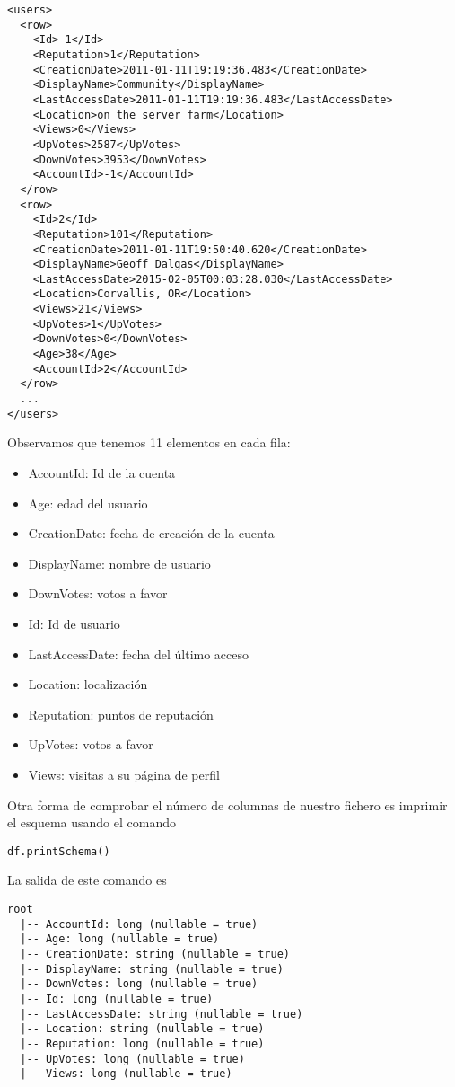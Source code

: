 \documentclass[12pt,a4paper,twoside,openright,titlepage,final]{article}
\begin{document}
\begin{verbatim}
<users>
  <row>
    <Id>-1</Id>
    <Reputation>1</Reputation>
    <CreationDate>2011-01-11T19:19:36.483</CreationDate>
    <DisplayName>Community</DisplayName>
    <LastAccessDate>2011-01-11T19:19:36.483</LastAccessDate>
    <Location>on the server farm</Location>
    <Views>0</Views>
    <UpVotes>2587</UpVotes>
    <DownVotes>3953</DownVotes>
    <AccountId>-1</AccountId>
  </row>
  <row>
    <Id>2</Id>
    <Reputation>101</Reputation>
    <CreationDate>2011-01-11T19:50:40.620</CreationDate>
    <DisplayName>Geoff Dalgas</DisplayName>
    <LastAccessDate>2015-02-05T00:03:28.030</LastAccessDate>
    <Location>Corvallis, OR</Location>
    <Views>21</Views>
    <UpVotes>1</UpVotes>
    <DownVotes>0</DownVotes>
    <Age>38</Age>
    <AccountId>2</AccountId>
  </row>
  ...
</users>
\end{verbatim}

Observamos que tenemos 11 elementos en cada fila:

\begin{itemize}
	\item AccountId: Id de la cuenta
	\item Age: edad del usuario
	\item CreationDate: fecha de creación de la cuenta
	\item DisplayName: nombre de usuario
	\item DownVotes: votos a favor
	\item Id: Id de usuario
	\item LastAccessDate: fecha del último acceso
	\item Location: localización
	\item Reputation: puntos de reputación
	\item UpVotes: votos a favor
	\item Views: visitas a su página de perfil
\end{itemize}

Otra forma de comprobar el número de columnas de nuestro fichero es imprimir el esquema usando el comando

\begin{verbatim}
df.printSchema()
\end{verbatim}

La salida de este comando es

\begin{verbatim}
root
  |-- AccountId: long (nullable = true)
  |-- Age: long (nullable = true)
  |-- CreationDate: string (nullable = true)
  |-- DisplayName: string (nullable = true)
  |-- DownVotes: long (nullable = true)
  |-- Id: long (nullable = true)
  |-- LastAccessDate: string (nullable = true)
  |-- Location: string (nullable = true)
  |-- Reputation: long (nullable = true)
  |-- UpVotes: long (nullable = true)
  |-- Views: long (nullable = true)
\end{verbatim}
\end{document}
